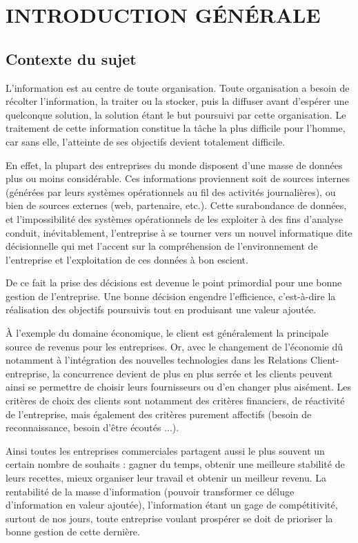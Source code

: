 \chapter*{INTRODUCTION GÉNÉRALE}
    \section[Contexte du sujet]{Contexte du sujet}
    L’information est au centre de toute organisation. Toute organisation a besoin
    de récolter l’information, la traiter ou la stocker, puis la diffuser avant d’espérer une
    quelconque solution, la solution étant le but poursuivi par cette organisation. Le
    traitement de cette information constitue la tâche la plus difficile pour l’homme, car sans
    elle, l’atteinte de ses objectifs devient totalement difficile. 
    \par
    En effet, la plupart des entreprises du monde disposent d’une masse de données plus ou
    moins considérable. Ces informations proviennent soit de sources internes (générées par
    leurs systèmes opérationnels au fil des activités journalières), ou bien de sources externes
    (web, partenaire, etc.). Cette surabondance de données, et l’impossibilité des systèmes
    opérationnels de les exploiter à des fins d’analyse conduit, inévitablement, l’entreprise à se
    tourner vers un nouvel informatique dite décisionnelle qui met l’accent sur la
    compréhension de l’environnement de l’entreprise et l’exploitation de ces données à bon
    escient.
    \par
    De ce fait la prise des décisions est devenue
    le point primordial pour une bonne gestion de
    l’entreprise. Une bonne décision engendre l’efficience,
    c’est-à-dire la réalisation des objectifs
    poursuivis tout en produisant une valeur ajoutée.
    \par
    À l’exemple du domaine
    économique, 
    le client est généralement la principale source de 
    revenus pour les entreprises. 
    Or, avec le changement de l’économie dû notamment
    à l’intégration des nouvelles technologies
    dans les Relations Client-entreprise, la concurrence
    devient de plus en plus serrée et les
    clients peuvent ainsi se permettre de choisir
    leurs fournisseurs ou d’en changer plus aisément.
    Les critères de choix des clients sont notamment des
    critères financiers, de réactivité de l’entreprise, mais
    également des critères purement affectifs
    (besoin de reconnaissance, besoin d’être écoutés ...).
    \par
    Ainsi toutes les entreprises commerciales partagent aussi
    le plus souvent un certain nombre de souhaits : gagner
    du temps, obtenir une meilleure
    stabilité de leurs recettes, mieux organiser leur travail et obtenir un meilleur
    revenu. \cite*{Barouch2010} La rentabilité de la masse d’information (pouvoir transformer ce déluge
    d’information en valeur ajoutée), l’information étant un gage de compétitivité, surtout
    de nos jours, toute entreprise voulant prospérer se doit de prioriser la bonne gestion de
    cette dernière.

